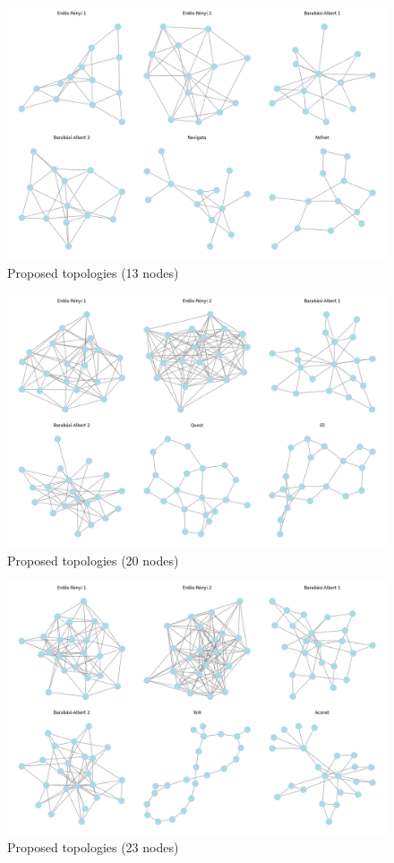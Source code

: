 \begin{figure}
    \centering
    \includegraphics[width=0.8\linewidth]{images/Topology set/13.png}
    \caption{Proposed topologies (13 nodes)}
    \label{fig:13_prop}
\end{figure}

\begin{figure}
    \centering
    \includegraphics[width=0.8\linewidth]{images/Topology set/20.png}
    \caption{Proposed topologies (20 nodes)}
    \label{fig:20_prop}
\end{figure}

\begin{figure}
    \centering
    \includegraphics[width=0.8\linewidth]{images/Topology set/23.png}
    \caption{Proposed topologies (23 nodes)}
    \label{fig:23_prop}
\end{figure}

